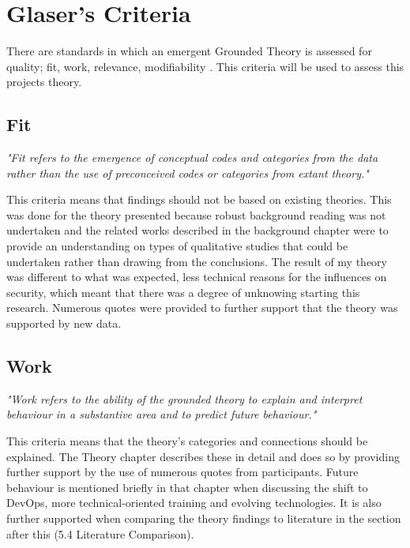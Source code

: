 \section{Glaser's Criteria}

There are standards in which an emergent Grounded Theory is assessed for quality; fit, work, relevance, modifiability \cite{crit}. This criteria will be used to assess this projects theory. 

\subsection{Fit}

\textit{"Fit refers to the emergence of conceptual codes and categories from the data rather than the use of preconceived codes or categories from extant theory." \cite{crit}}
\newline
\par 
This criteria means that findings should not be based on existing theories. This was done for the theory presented because robust background reading was not undertaken and the related works described in the background chapter were to provide an understanding on types of qualitative studies that could be undertaken rather than drawing from the conclusions. The result of my theory was different to what was expected, less technical reasons for the influences on security, which meant that there was a degree of unknowing starting this research. Numerous quotes were provided to further support that the theory was supported by new data. 

\subsection{Work}

\textit{"Work refers to the ability of the grounded theory to explain and interpret behaviour in a substantive area and to predict future behaviour." \cite{crit}}
\newline
\par 
This criteria means that the theory's categories and connections should be explained. The Theory chapter describes these in detail and does so by providing further support by the use of numerous quotes from participants. Future behaviour is mentioned briefly in that chapter when discussing the shift to DevOps, more technical-oriented training and evolving technologies. It is also further supported when comparing the theory findings to literature in the section after this (5.4 Literature Comparison).


